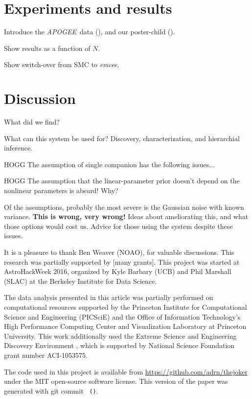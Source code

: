 \documentclass[12pt, preprint]{aastex}
\newcommand{\project}[1]{\textsl{#1}}
\newcommand{\acronym}[1]{{\small{#1}}}
\newcommand{\apogee}{\project{\acronym{APOGEE}}}
\newcommand{\emcee}{\project{emcee}}
\begin{document}
\section{Experiments and results}

Introduce the \apogee\ data
(\citealt{Majewski:2015,Holtzman:2015,Eisenstein:2011,Alam:2015}), and
our poster-child (\citealt{Troup:2016}).

Show results as a function of $N$.

Show switch-over from SMC to \emcee.

\section{Discussion}

What did we find?

What can this system be used for? Discovery, characterization, and
hierarchial inference.

HOGG The assumption of single companion has the following issues...

HOGG The assumption that the linear-parameter prior doesn't depend
on the nonlinear parameters is absurd! Why?

Of the assumptions, probably the most severe is the Gaussian noise
with known variance. \textbf{This is wrong, very wrong!} Ideas about
ameliorating this, and what those options would cost us. Advice for
those using the system despite these issues.

\acknowledgements
It is a pleasure to thank
  Ben Weaver (NOAO),
for valuable discussions.
This research was partially supported by [many grants].
This project was started at AstroHackWeek 2016, organized by Kyle
Barbary (UCB) and Phil Marshall (SLAC) at the Berkeley Institute for
Data Science.

The data analysis presented in this article was partially performed on
computational resources supported by the Princeton Institute for Computational
Science and Engineering (PICSciE) and the Office of Information Technology's
High Performance Computing Center and Visualization Laboratory at Princeton
University.
This work additionally used the Extreme Science and Engineering Discovery
Environment \citep[XSEDE;][]{Towns:2014}, which is supported by National
Science Foundation grant number ACI-1053575.

The code used in this project is available from
\url{https://github.com/adrn/thejoker} under the MIT open-source
software license. This version of the paper was generated with git
commit \texttt{\githash~(\gitdate)}.



\end{document}
